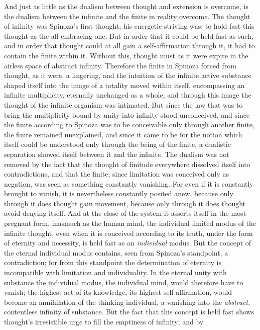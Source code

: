And just as little as the dualism between thought and extension is
overcome, is the dualism between the infinite and the finite in reality
overcome. The thought of infinity was Spinoza's first thought; his
energetic striving was: to hold fast this thought as the all-embracing
one. But in order that it could be held fast as such, and in order that
thought could at all gain a self-affirmation through it, it had to
contain the finite within it. Without this, thought must as it were
expire in the airless space of abstract infinity. Therefore the finite
in Spinoza forced from thought, as it were, a lingering, and the
intuition of the infinite active substance shaped itself into the image
of a totality moved within itself, encompassing an infinite
multiplicity, eternally unchanged as a whole, and through this image
the thought of the infinite organism was intimated. But since the law
that was to bring the multiplicity bound by unity into infinity stood
unconceived, and since the finite according to Spinoza was to be
conceivable only through another finite, the finite remained
unexplained, and since it came to be for the notion which itself could
be understood only through the being of the finite, a dualistic
separation showed itself between it and the infinite. The dualism was
not removed by the fact that the thought of finitude everywhere
dissolved itself into contradictions, and that the finite, since
limitation was conceived only as negation, was seen as something
constantly vanishing. For even if it is constantly brought
to vanish, it is nevertheless constantly posited anew, because only
through it does thought gain movement, because only through it does
thought avoid denying itself. And at the close of the system it asserts
itself in the most pregnant form, inasmuch as the human mind, the
individual limited modus of the infinite thought, even when it is
conceived according to its truth, under the form of eternity and
necessity, is held fast as an \emph{individual} modus. But the concept
of the eternal individual modus contains, seen from Spinoza's
standpoint, a contradiction; for from this standpoint the determination
of eternity is incompatible with limitation and individuality. In the
eternal unity with substance the individual modus, the individual mind,
would therefore have to vanish; the highest act of its knowledge, its
highest self-affirmation, would become an annihilation of the thinking
individual, a vanishing into the \emph{abstract}, contentless infinity
of substance. But the fact that this concept is held fast shows
thought's irresistible urge to fill the emptiness of infinity; and by
